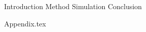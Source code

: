 \documentclass[12pt, a4paper, oneside, full]{article}
\begin{document}
\title{\thesistitle}
\author{\thesisauthor}
\date{\today}



{Introduction}
{Method}
{Simulation}
{Conclusion}

\clearpage

\begin{appendices}
	\label{sec:appendix}
	\FloatBarrier
	{Appendix.tex}
	\FloatBarrier
	\clearpage
\end{appendices}

\clearpage %


\begin{refcontext}[sorting=nyt]  %
\sloppy
\printbibliography[heading=bibintoc]
\end{refcontext}


\end{document}
